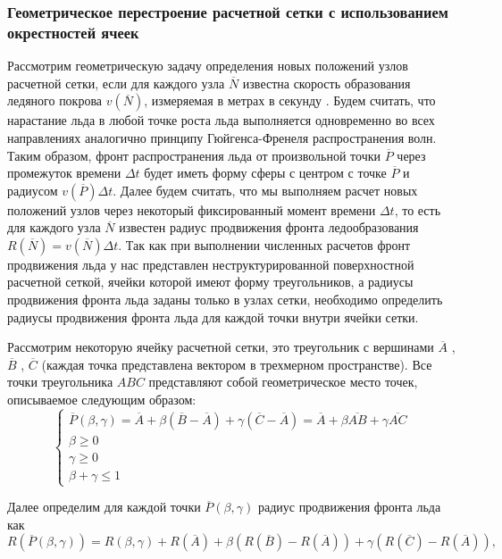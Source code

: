 \subsubsection{Геометрическое перестроение расчетной сетки с использованием окрестностей ячеек}

Рассмотрим геометрическую задачу определения новых положений узлов расчетной сетки, если для каждого узла $\overline{N}$ известна скорость образования ледяного покрова $v(\overline{N})$, измеряемая в метрах в секунду \cite{Rybakov2023GeoRemesh}.
Будем считать, что нарастание льда в любой точке роста льда выполняется одновременно во всех направлениях аналогично принципу Гюйгенса-Френеля распространения волн.
Таким образом, фронт распространения льда от произвольной точки $\overline{P}$ через промежуток времени $\Delta t$ будет иметь форму сферы с центром с точке $\overline{P}$ и радиусом $v(\overline{P})\Delta t$.
Далее будем считать, что мы выполняем расчет новых положений узлов через некоторый фиксированный момент времени $\Delta t$, то есть для каждого узла $\overline{N}$ известен радиус продвижения фронта ледообразования $R(\overline{N}) = v(\overline{N}) \Delta t$.
Так как при выполнении численных расчетов фронт продвижения льда у нас представлен неструктурированной поверхностной расчетной сеткой, ячейки которой имеют форму треугольников, а радиусы продвижения фронта льда заданы только в узлах сетки, необходимо определить радиусы продвижения фронта льда для каждой точки внутри ячейки сетки.

Рассмотрим некоторую ячейку расчетной сетки, это треугольник с вершинами $\overline{A}$ , $\overline{B}$ , $\overline{C}$ (каждая точка представлена вектором в трехмерном пространстве).
Все точки треугольника $ABC$ представляют собой геометрическое место точек, описываемое следующим образом:
\begin{equation}
	\left\{
		\begin{aligned}
			\overline{P}(\beta, \gamma) = \overline{A} + \beta(\overline{B} - \overline{A}) + \gamma(\overline{C} - \overline{A}) = \overline{A} + \beta \overline{AB} + \gamma \overline{AC} \\
			\beta \ge 0 \\
			\gamma \ge 0 \\
			\beta + \gamma \le 1
		\end{aligned}
	\right.
\end{equation}

Далее определим для каждой точки $\overline{P}(\beta,\gamma)$ радиус продвижения фронта льда как
\begin{equation}
	R(\overline{P}(\beta,\gamma)) = R(\beta,\gamma) + R(\overline{A}) + \beta(R(\overline{B}) - R(\overline{A})) + \gamma(R(\overline{C}) - R(\overline{A})),
\end{equation}

